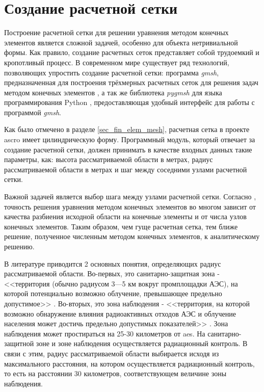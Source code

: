 \section{Создание расчетной сетки}
\label{sec_mesh_gen}

Построение расчетной сетки для решении уравнения методом конечных элементов является сложной задачей, особенно для 
объекта нетривиальной формы. Как правило, создание расчетных сеток представляет собой трудоемкий и кропотливый процесс. 
В современном мире существует ряд технологий, позволяющих упростить создание расчетной сетки: программа \textit{gmsh}, 
предназначенная для построения трёхмерных расчетных сеток для решения задач методом конечных элементов \cite{gmsh_man}, 
а так же библиотека \textit{pygmsh} для языка программирования Python \cite{pygmsh_doc}, предоставляющая удобный 
интерфейс для работы с программой \textit{gmsh}.

Как было отмечено в разделе \ref{sec_fin_elem_mesh}, расчетная сетка в проекте \ac{ascro} имеет цилиндрическую форму. 
Программный модуль, который отвечает за создание расчетной сетки, должен принимать в качестве входных данных такие 
параметры, как: высота рассматриваемой области в метрах, радиус рассматриваемой области в метрах и шаг между соседними 
узлами расчетной сетки.

Важной задачей является выбор шага между узлами расчетной сетки. Согласно \cite{mke}, точность решения уравнения методом 
конечных элементов во многом зависит от качества разбиения исходной области на конечные элементы и от числа узлов 
конечных элементов. Таким образом, чем гуще расчетная сетка, тем ближе решение, полученное численным методом конечных 
элементов, к аналитическому решению. 

В литературе приводится 2 основных понятия, определяющих радиус рассматриваемой области. Во-первых, это 
санитарно-защитная зона - <<территория (обычно радиусом 3—5 км вокруг промплощадки АЭС), на которой потенциально 
возможно облучение, превышающее предельно допустимое>> \cite{aes_security}. Во-вторых, это зона наблюдения - 
<<территория, на которой возможно обнаружение влияния радиоактивных отходов АЭС и облучение населения может достичь 
предельно допустимых показателей>> \cite{aes_security}. Зона наблюдения может простираться на 25-30 километров от 
\ac{aes}. На санитарно-защитной зоне и зоне наблюдения осуществляется радиационный контроль. В связи с этим, радиус 
рассматриваемой области выбирается исходя из максимального расстояния, на котором осуществляется радиационный контроль, 
то есть на расстоянии 30 километров, соответствующем величине зоны наблюдения.

